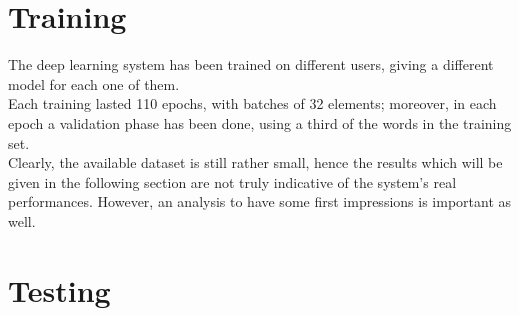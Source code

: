 \documentclass[8pt,notitlepage]{report}
\begin{document}
	\section{Training}
		The deep learning system has been trained on different users, giving a different model for each one of them. \\
		Each training lasted 110 epochs, with batches of 32 elements; moreover, in each epoch a validation phase has been done, using a third of the words in the training set. \\
		Clearly, the available dataset is still rather small, hence the results which will be given in the following section are not truly indicative of the system's real performances. However, an analysis to have some first impressions is important as well.
		
	\section{Testing}
		
\end{document}
